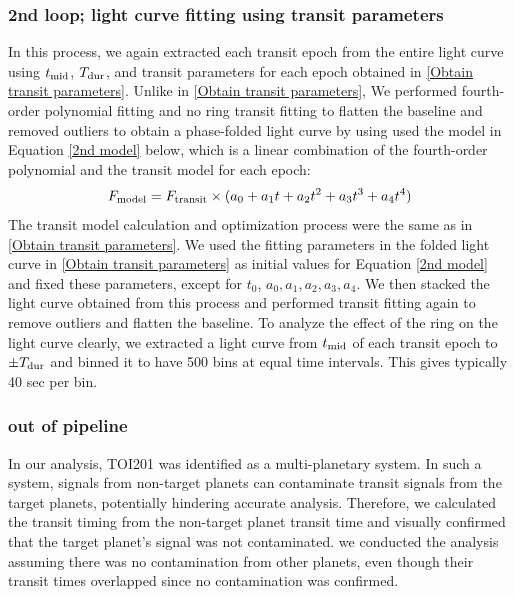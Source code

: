 \documentclass[fleqn,usenatbib, onecolumn,dvipdfmx]{mnras}
\begin{document}
\subsubsection{2nd loop; light curve fitting using transit parameters} \label{2nd loop; light curve fitting using transit parameters}
In this process, we again extracted each transit epoch from the entire light curve using $t_{\rm{mid}}$, $T_{\rm{dur}}$, and transit parameters for each epoch obtained in \ref{Obtain transit parameters}. Unlike in \ref{Obtain transit parameters}, We performed fourth-order polynomial fitting and no ring transit fitting to flatten the baseline and removed outliers to obtain a phase-folded light curve by using used the model in Equation \ref{2nd model} below, which is a linear combination of the fourth-order polynomial and the transit model for each epoch:
\begin{equation}\label{2nd model}
    F_{\rm{model}}=F_{\rm{transit}}\times(a_0+a_{1}t+a_{2}t^2+a_{3}t^3+a_{4}t^4)
\end{equation}
The transit model calculation and optimization process were the same as in \ref{Obtain transit parameters}. We used the fitting parameters in the folded light curve in \ref{Obtain transit parameters} as initial values for Equation \ref{2nd model} and fixed these parameters, except for $t_0$, $a_0, a_{1}, a_{2}, a_{3}, a_{4}$. We then stacked the light curve obtained from this process and performed transit fitting again to remove outliers and flatten the baseline. To analyze the effect of the ring on the light curve clearly, we extracted a light curve from $t_{\rm{mid}}$ of each transit epoch to $\pm T_{\rm{dur}}$ and binned it to have 500 bins at equal time intervals. This gives typically 40 sec per bin.

\subsubsection{out of pipeline} \label{out of pipeline}
In our analysis, TOI201 was identified as a multi-planetary system. In such a system, signals from non-target planets can contaminate transit signals from the target planets, potentially hindering accurate analysis. Therefore, we calculated the transit timing from the non-target planet transit time and visually confirmed that the target planet's signal was not contaminated. we conducted the analysis assuming there was no contamination from other planets, even though their transit times overlapped since no contamination was confirmed.
\end{document}
